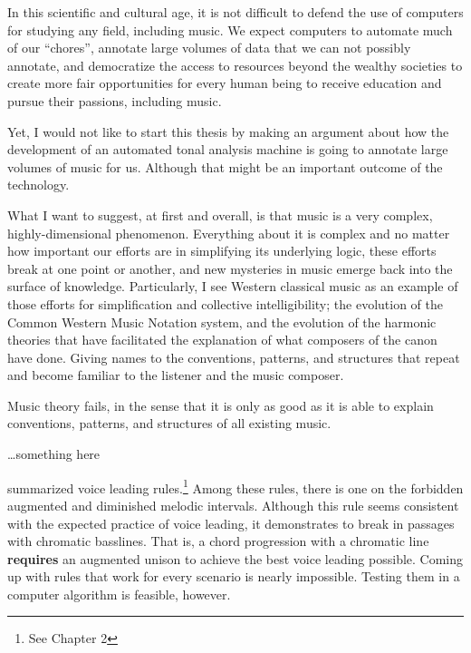 
In this scientific and cultural age, it is not difficult to
defend the use of computers for studying any field,
including music. We expect computers to automate much of our
``chores'', annotate large volumes of data that we can not
possibly annotate, and democratize the access to resources
beyond the wealthy societies to create more fair
opportunities for every human being to receive education and
pursue their passions, including music.

Yet, I would not like to start this thesis by making an
argument about how the development of an automated tonal
analysis machine is going to annotate large volumes of music
for us. Although that might be an important outcome of the
technology.

What I want to suggest, at first and overall, is that music
is a very complex, highly-dimensional phenomenon. Everything
about it is complex and no matter how important our efforts
are in simplifying its underlying logic, these efforts break
at one point or another, and new mysteries in music emerge
back into the surface of knowledge. Particularly, I see
Western classical music as an example of those efforts for
simplification and collective intelligibility; the evolution
of the Common Western Music Notation system, and the
evolution of the harmonic theories that have facilitated the
explanation of what composers of the canon have done. Giving
names to the conventions, patterns, and structures that
repeat and become familiar to the listener and the music
composer.

Music theory fails, in the sense that it is only as good as
it is able to explain conventions, patterns, and structures
of all existing music.

\dots something here


\textcite{huron2016voice} summarized voice leading
rules.\footnote{See Chapter 2} Among these rules, there is
one on the forbidden augmented and diminished melodic
intervals. Although this rule seems consistent with the
expected practice of voice leading, it demonstrates to break
in passages with chromatic basslines. That is, a chord
progression with a chromatic line \textbf{requires} an
augmented unison to achieve the best voice leading possible.
Coming up with rules that work for every scenario is nearly
impossible. Testing them in a computer algorithm is
feasible, however.

